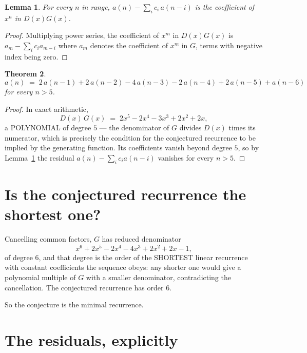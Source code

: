 \documentclass[11pt,a4paper]{article}
\theoremstyle{plain}
\newtheorem{theorem}{Theorem}
\newtheorem{lemma}[theorem]{Lemma}
\theoremstyle{definition}
\begin{document}
\begin{lemma}\label{lem:key}
For every $n$ in range, $a(n)-\sum_i c_i\,a(n-i)$ is the coefficient of $x^{n}$ in
$D(x)G(x)$.
\end{lemma}

\begin{proof}
Multiplying power series, the coefficient of $x^{m}$ in $D(x)G(x)$ is
$a_m-\sum_i c_i a_{m-i}$ where $a_m$ denotes the coefficient of $x^{m}$ in $G$, terms with
negative index being zero.
\end{proof}

\begin{theorem}
\[
a(n)\;=\;2\,a(n-1) + 2\,a(n-2) - 4\,a(n-3) - 2\,a(n-4) + 2\,a(n-5) + a(n-6)
\]
for every $n>5$.
\end{theorem}

\begin{proof}
In exact arithmetic,
\[
D(x)\,G(x)\;=\;2 x^{5} - 2 x^{4} - 3 x^{3} + 2 x^{2} + 2 x,
\]
a POLYNOMIAL of degree $5$ --- the denominator of $G$ divides $D(x)$ times its numerator,
which is precisely the condition for the conjectured recurrence to be implied by the
generating function. Its coefficients vanish beyond degree $5$, so by
Lemma~\ref{lem:key} the residual $a(n)-\sum_ic_ia(n-i)$ vanishes for every
$n>5$.
\end{proof}

\section{Is the conjectured recurrence the shortest one?}

Cancelling common factors, $G$ has reduced denominator
\[
x^{6} + 2 x^{5} - 2 x^{4} - 4 x^{3} + 2 x^{2} + 2 x - 1,
\]
of degree $6$, and that degree is the order of the SHORTEST linear recurrence with
constant coefficients the sequence obeys: any shorter one would give a polynomial multiple of
$G$ with a smaller denominator, contradicting the cancellation. The conjectured recurrence has
order $6$.

So the conjecture is the minimal recurrence.

\section{The residuals, explicitly}
\end{document}
